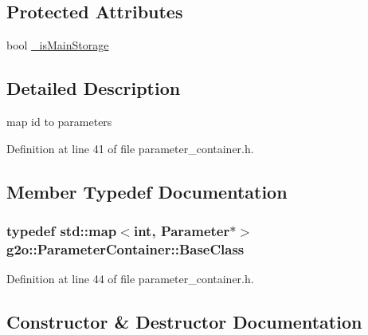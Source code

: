 \subsection*{Protected Attributes}
\begin{DoxyCompactItemize}
\item 
bool \hyperlink{classg2o_1_1ParameterContainer_a2ff1e92bc6a486d48043e2191807bd47}{\+\_\+is\+Main\+Storage}
\end{DoxyCompactItemize}


\subsection{Detailed Description}
map id to parameters 

Definition at line 41 of file parameter\+\_\+container.\+h.



\subsection{Member Typedef Documentation}
\subsubsection[{\texorpdfstring{Base\+Class}{BaseClass}}]{\setlength{\rightskip}{0pt plus 5cm}typedef std\+::map$<$int, {\bf Parameter}$\ast$$>$ {\bf g2o\+::\+Parameter\+Container\+::\+Base\+Class}}\hypertarget{classg2o_1_1ParameterContainer_a200fdfdce01f7fb5f96e02a8ddf666ac}{}\label{classg2o_1_1ParameterContainer_a200fdfdce01f7fb5f96e02a8ddf666ac}


Definition at line 44 of file parameter\+\_\+container.\+h.



\subsection{Constructor \& Destructor Documentation}
